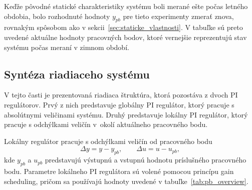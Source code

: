 \begin{table}[b!]
    \centering
    \caption{Parametre pracovných bodov, identifikované prenosové funkcie a PI regulátory}
    \label{tab:pb_overview}
\end{table}

Keďže pôvodné statické charakteristiky systému boli merané ešte počas letného obdobia, bolo rozhodnuté hodnoty $y_{pb}$ pre tieto experimenty zmerať znova, rovnakým spôsobom ako v sekcii~\ref{sec:staticke_vlastnosti}.  
V tabuľke sú preto uvedené aktuálne hodnoty pracovných bodov, ktoré vernejšie reprezentujú stav systému počas meraní v zimnom období.



\subsection{Syntéza riadiaceho systému}

V tejto časti je prezentovaná riadiaca štruktúra,
ktorá pozostáva z dvoch PI regulátorov.
Prvý z nich predstavuje globálny PI regulátor,
ktorý pracuje s absolútnymi veličinami systému.
Druhý predstavuje lokálny PI regulátor,
ktorý pracuje s odchýlkami veličín
v~okolí aktuálneho pracovného bodu.

Lokálny regulátor pracuje s odchýlkami veličín od pracovného bodu
\begin{equation}
\Delta y = y - y_{pb},
\qquad
\Delta u = u - u_{pb},
\label{eq:pi_switch_delta_variables}
\end{equation}
kde $y_{pb}$ a $u_{pb}$
predstavujú výstupnú a vstupnú hodnotu príslušného pracovného bodu.
Parametre lokálneho PI regulátora
sú volené pomocou princípu gain scheduling,
pričom sa používajú hodnoty uvedené v tabuľke~\ref{tab:pb_overview}.

